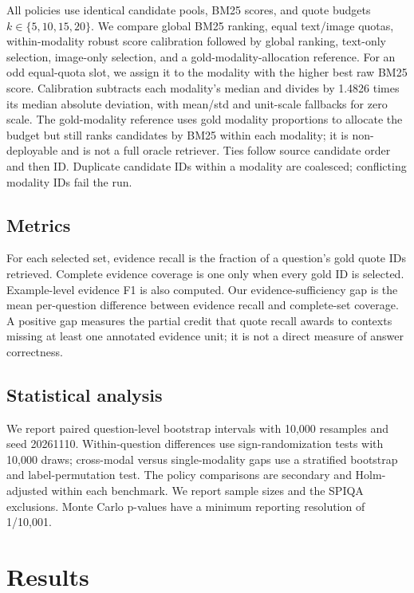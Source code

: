 \documentclass[11pt]{article}
\begin{document}
All policies use identical candidate pools, BM25 scores, and quote budgets \(k\in\{5,10,15,20\}\). We compare global BM25 ranking, equal text/image quotas, within-modality robust score calibration followed by global ranking, text-only selection, image-only selection, and a gold-modality-allocation reference. For an odd equal-quota slot, we assign it to the modality with the higher best raw BM25 score. Calibration subtracts each modality's median and divides by 1.4826 times its median absolute deviation, with mean/std and unit-scale fallbacks for zero scale. The gold-modality reference uses gold modality proportions to allocate the budget but still ranks candidates by BM25 within each modality; it is non-deployable and is not a full oracle retriever. Ties follow source candidate order and then ID. Duplicate candidate IDs within a modality are coalesced; conflicting modality IDs fail the run.

\subsection{Metrics}
For each selected set, evidence recall is the fraction of a question's gold quote IDs retrieved. Complete evidence coverage is one only when every gold ID is selected. Example-level evidence F1 is also computed. Our evidence-sufficiency gap is the mean per-question difference between evidence recall and complete-set coverage. A positive gap measures the partial credit that quote recall awards to contexts missing at least one annotated evidence unit; it is not a direct measure of answer correctness.

\subsection{Statistical analysis}
We report paired question-level bootstrap intervals with 10,000 resamples and seed 20261110. Within-question differences use sign-randomization tests with 10,000 draws; cross-modal versus single-modality gaps use a stratified bootstrap and label-permutation test. The policy comparisons are secondary and Holm-adjusted within each benchmark. We report sample sizes and the SPIQA exclusions. Monte Carlo p-values have a minimum reporting resolution of 1/10,001.

\section{Results}
\end{document}
